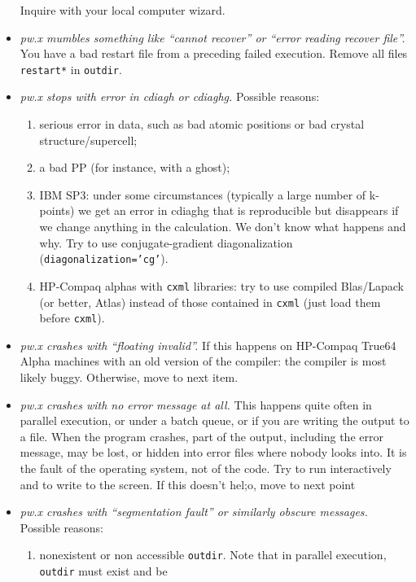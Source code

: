\documentclass[12pt]{article}
\begin{document}
\begin{itemize}
      Inquire with your local computer wizard.
\item {\em pw.x mumbles something like ``cannot recover'' or
      ``error reading recover file''.}  You have a bad restart file 
      from a preceding failed execution. Remove all files {\tt restart*}
      in {\tt outdir}.
\item {\em pw.x stops with error in cdiagh or cdiaghg.}
      Possible reasons:
      \begin{enumerate}
      \item
      serious error in data, such as bad atomic positions or bad 
         crystal structure/supercell;
      \item
      a bad PP (for instance, with a ghost);
      \item
      IBM SP3: under some circumstances (typically a large number
         of k-points) we get an error in cdiaghg that is reproducible
         but disappears if we change anything in the calculation.
         We don't know what happens and why. Try to use
         conjugate-gradient diagonalization ({\tt diagonalization='cg'}).
      \item
      HP-Compaq alphas with {\tt cxml} libraries: try to use
         compiled Blas/Lapack (or better, Atlas) instead of those
         contained in {\tt cxml} (just load them before {\tt cxml}).
      \end{enumerate}
\item {\em pw.x crashes with ``floating invalid''.}
      If this happens on HP-Compaq True64 Alpha machines with an old
      version of the compiler: the compiler is most likely buggy.
      Otherwise, move to next item.
\item {\em pw.x crashes with no error message at all.}
         This happens quite often in parallel execution, or under a batch
         queue, or if you are writing the output to a file. When the
         program crashes, part of the output, including the error message,
         may be lost, or hidden into error files where nobody looks into.
         It is the fault of the operating system, not of the code.
         Try to run interactively and to write to the screen. If this
         doesn't hel;o, move to next point
\item {\em pw.x crashes with ``segmentation fault'' or similarly obscure
       messages.}
      Possible reasons:
      \begin{enumerate}
      \item
         nonexistent or non accessible {\tt outdir}. 
         Note that in parallel execution, {\tt outdir} must exist and be 

\end{enumerate}
\end{itemize}
\end{document}
